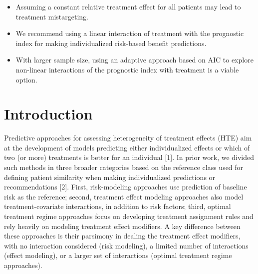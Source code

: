 \documentclass[]{elsarticle} %
\providecommand{\tightlist}{%
  \setlength{\itemsep}{0pt}\setlength{\parskip}{0pt}}
\begin{document}
\begin{itemize}
\tightlist
\item
  Assuming a constant relative treatment effect for all patients may
  lead to treatment mistargeting.
\item
  We recommend using a linear interaction of treatment with the
  prognostic index for making individualized risk-based benefit
  predictions.
\item
  With larger sample size, using an adaptive approach based on AIC to
  explore non-linear interactions of the prognostic index with treatment
  is a viable option.
\end{itemize}

\hypertarget{introduction}{%
\section{Introduction}\label{introduction}}

Predictive approaches for assessing heterogeneity of treatment effects
(HTE) aim at the development of models predicting either individualized
effects or which of two (or more) treatments is better for an individual
{[}1{]}. In prior work, we divided such methods in three broader
categories based on the reference class used for defining patient
similarity when making individualized predictions or recommendations
{[}2{]}. First, risk-modeling approaches use prediction of baseline risk
as the reference; second, treatment effect modeling approaches also
model treatment-covariate interactions, in addition to risk factors;
third, optimal treatment regime approaches focus on developing treatment
assignment rules and rely heavily on modeling treatment effect
modifiers. A key difference between these approaches is their parsimony
in dealing the treatment effect modifiers, with no interaction
considered (risk modeling), a limited number of interactions (effect
modeling), or a larger set of interactions (optimal treatment regime
approaches).
\end{document}
